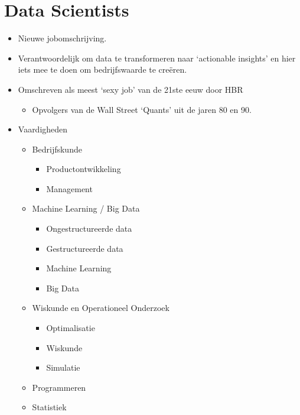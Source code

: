 \documentclass[]{memoir}
\providecommand{\tightlist}{%
  \setlength{\itemsep}{0pt}\setlength{\parskip}{0pt}}
\begin{document}
\section{Data Scientists}\label{data-scientists}

\begin{itemize}
\tightlist
\item
  Nieuwe jobomschrijving.
\item
  Verantwoordelijk om data te transformeren naar `actionable insights'
  en hier iets mee te doen om bedrijfswaarde te creëren.
\item
  Omschreven als meest `sexy job' van de 21ste eeuw door HBR

  \begin{itemize}
  \tightlist
  \item
    Opvolgers van de Wall Street `Quants' uit de jaren 80 en 90.
  \end{itemize}
\item
  Vaardigheden

  \begin{itemize}
  \tightlist
  \item
    Bedrijfskunde

    \begin{itemize}
    \tightlist
    \item
      Productontwikkeling
    \item
      Management
    \end{itemize}
  \item
    Machine Learning / Big Data

    \begin{itemize}
    \tightlist
    \item
      Ongestructureerde data
    \item
      Gestructureerde data
    \item
      Machine Learning
    \item
      Big Data
    \end{itemize}
  \item
    Wiskunde en Operationeel Onderzoek

    \begin{itemize}
    \tightlist
    \item
      Optimalisatie
    \item
      Wiskunde
    \item
      Simulatie
    \end{itemize}
  \item
    Programmeren
  \item
    Statistiek


\end{itemize}
\end{itemize}
\end{document}
